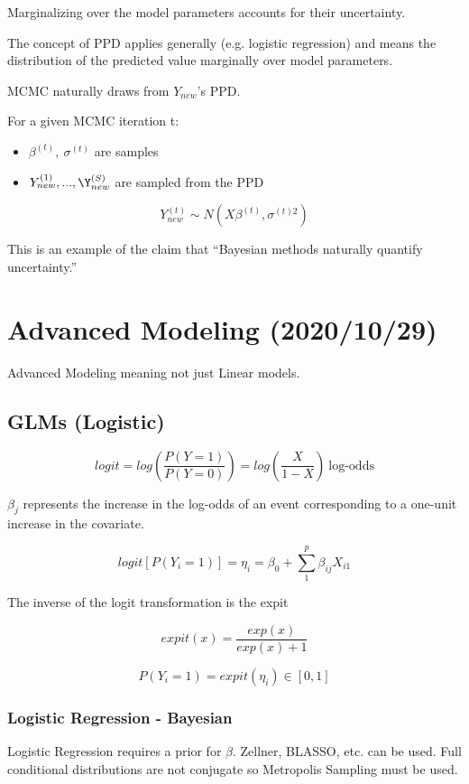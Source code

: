 \documentclass[11pt]{article}
\begin{document}
Marginalizing over the model parameters accounts for their uncertainty.

The concept of PPD applies generally (e.g. logistic regression) and means the
distribution of the predicted value marginally over model parameters.


MCMC naturally draws from \(Y_{new}\)'s PPD.

For a given MCMC iteration t:
\begin{itemize}
\item \(\beta^{(t)}, \ \sigma^{(t)}\) are samples
\item \(Y_{new}^{(1)}, ..., \Y_{new}^{(S)}\) are sampled from the PPD
\end{itemize}

$$
Y_{new}^{(t)} \sim N(X \beta^{(t)}, \sigma^{(t)2})
$$

This is an example of the claim that ``Bayesian methods naturally quantify uncertainty.''
\section{Advanced Modeling (2020/10/29)}
\label{sec:org68d4f4f}

Advanced Modeling meaning not just Linear models.

\subsection{GLMs (Logistic)}
\label{sec:org70e6d65}

$$
logit = log \left( \frac{P(Y= 1)}{P(Y = 0)} \right) = log \left( \frac{X}{1 - X}
\right) \ \text{log-odds}
$$


\(\beta_j\) represents the increase in the log-odds of an event corresponding to a
one-unit increase in the covariate.

$$
logit \left[ P(Y_i = 1) \right] = \eta_i = \beta_0 + \sum_{1}^{p} \beta_{ij} X_{i1}
$$

The inverse of the logit transformation is the expit

$$
expit(x) = \frac{exp(x)}{exp(x) + 1}
$$

$$
P(Y_i = 1) = expit(\eta_i) \in [0, 1]
$$

\subsubsection{Logistic Regression - Bayesian}
\label{sec:org40cecd6}

Logistic Regression requires a prior for \(\beta\). Zellner, BLASSO, etc. can be
used. Full conditional distributions are not conjugate so Metropolis Sampling
must be used.
\end{document}
